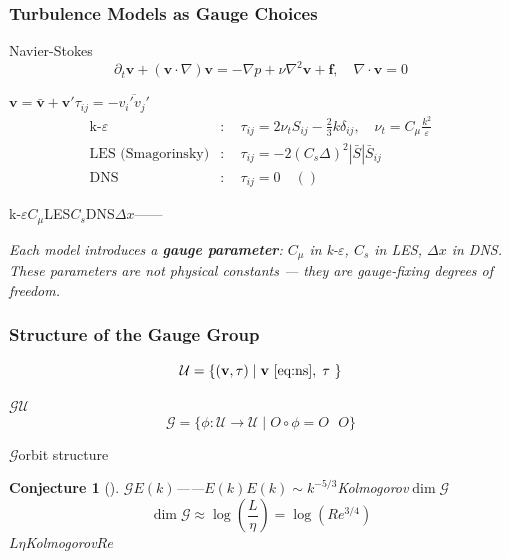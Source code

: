 \documentclass[12pt,a4paper]{article}
\newtheorem{conjecture}[theorem]{Conjecture}
\theoremstyle{remark}
\newcommand{\G}{\mathcal{G}}
\newcommand{\U}{\mathcal{U}}
\newcommand{\vfield}{\mathbf{v}}
\begin{document}
\subsubsection{ Turbulence Models as Gauge Choices}

Navier-Stokes
\begin{equation}
    \partial_t \vfield + (\vfield \cdot \nabla)\vfield = -\nabla p + \nu \nabla^2 \vfield + \mathbf{f}, \quad \nabla \cdot \vfield = 0
    \label{eq:ns}
\end{equation}

$\vfield = \bar{\vfield} + \vfield'$$\tau_{ij} = -\overline{v_i' v_j'}$\textbf{}
\begin{align}
    \text{k-}\varepsilon &: \quad \tau_{ij} = 2\nu_t S_{ij} - \frac{2}{3}k\delta_{ij}, \quad \nu_t = C_\mu \frac{k^2}{\varepsilon} \label{eq:gauge-ke} \\
    \text{LES (Smagorinsky)} &: \quad \tau_{ij} = -2(C_s\Delta)^2 |\bar{S}| \bar{S}_{ij} \label{eq:gauge-les} \\
    \text{DNS} &: \quad \tau_{ij} = 0 \quad (\text{}) \label{eq:gauge-dns}
\end{align}

\textbf{}k-$\varepsilon$$C_\mu$LES$C_s$DNS$\Delta x$——

\medskip
\noindent\textit{Each model introduces a \textbf{gauge parameter}: $C_\mu$ in k-$\varepsilon$, $C_s$ in LES, $\Delta x$ in DNS. These parameters are not physical constants — they are gauge-fixing degrees of freedom.}

\subsubsection{ Structure of the Gauge Group}

\textbf{}
\begin{equation}
    \U = \{(\vfield, \tau) \mid \vfield \text{  } \eqref{eq:ns}, \; \tau \text{ }\}
\end{equation}

$\G$$\U$
\begin{equation}
    \G = \{\phi: \U \to \U \mid O \circ \phi = O \text{  } O\}
\end{equation}

$\G$orbit structure

\begin{conjecture}[]
$\G$$E(k)$——$E(k)$$E(k) \sim k^{-5/3}$Kolmogorov$\dim \G$
\begin{equation}
    \dim \G \approx \log\left(\frac{L}{\eta}\right) = \log\left(Re^{3/4}\right)
\end{equation}
$L$$\eta$Kolmogorov$Re$
\end{conjecture}
\end{document}
